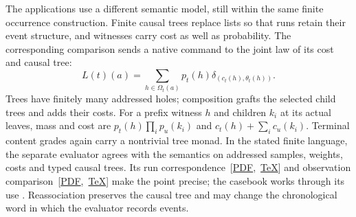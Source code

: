 \documentclass[11pt]{article}
\numberwithin{equation}{section}
\theoremstyle{definition}\newtheorem{definition}[theorem]{Definition}
\begin{document}
The applications use a different semantic model, still within the same
finite occurrence construction. Finite causal trees replace lists so that
runs retain their event structure, and witnesses carry cost as well as
probability. The corresponding comparison sends a native command to the
joint law of its cost and causal tree:
\begin{equation}\label{eq:joint-main}
 L(t)(a)=\sum_{h\in\Omega_t(a)}p_t(h)
              \delta_{(c_t(h),\theta_t(h))}.
\end{equation}
Trees have finitely many addressed holes; composition grafts the selected
child trees and adds their costs. For a prefix witness $h$ and children
$k_i$ at its actual leaves, mass and cost are
$p_t(h)\prod_i p_u(k_i)$ and $c_t(h)+\sum_i c_u(k_i)$.
Terminal content grades again carry a nontrivial tree monad.
In the stated finite language, the separate evaluator agrees with
the semantics on addressed samples, weights, costs and typed causal trees.
Its run correspondence~\mbox{[\href{https://github.com/eternal-november/eos-research-programmes/blob/10e771644cfdf58c3d05e989e4b26cae7164c80a/projects/contextual-composition/protocols/plural-semantics/Plural_Semantics_for_Result_Dependent_Protocols.pdf}{PDF}, \href{https://github.com/eternal-november/eos-research-programmes/blob/10e771644cfdf58c3d05e989e4b26cae7164c80a/projects/contextual-composition/protocols/plural-semantics/Plural_Semantics_for_Result_Dependent_Protocols.tex\#L504}{TeX}]} and observation comparison~\mbox{[\href{https://github.com/eternal-november/eos-research-programmes/blob/10e771644cfdf58c3d05e989e4b26cae7164c80a/projects/contextual-composition/protocols/plural-semantics/Plural_Semantics_for_Result_Dependent_Protocols.pdf}{PDF}, \href{https://github.com/eternal-november/eos-research-programmes/blob/10e771644cfdf58c3d05e989e4b26cae7164c80a/projects/contextual-composition/protocols/plural-semantics/Plural_Semantics_for_Result_Dependent_Protocols.tex\#L596}{TeX}]}
make the point precise; the casebook works through its use \cite[Sec.~2]{Casebook}.
Reassociation preserves the causal tree and may change the chronological
word in which the evaluator records events.
\end{document}
